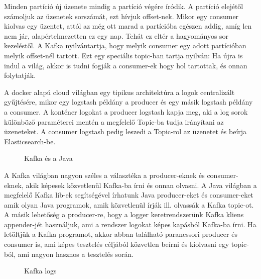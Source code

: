 Minden partíció új üzenete mindig a partíció végére íródik. A partíció elejétől számoljuk az üzenetek sorszámát, ezt hívjuk offset-nek. Mikor egy consumer kiolvas egy üzentet, attól az még ott marad a partícióba egészen addig, amíg len nem jár, alapértelmezetten ez egy nap. Tehát ez eltér a hagyományos sor kezeléstől. A Kafka nyilvántartja, hogy melyik consumer egy adott partícióban melyik offset-nél tartott. Ezt egy speciális topic-ban tartja nyilván: Ha újra is indul a világ, akkor is tudni fogják a consumer-ek hogy hol tartottak, és onnan folytatják.


A docker alapú cloud világban egy tipikus architektúra a logok centralizált gyűjtésére, mikor egy logstash példány a producer és egy másik logstash példány a consumer. A konténer logokat a producer logstash kapja meg, aki a log sorok különböző paraméterei mentén a megfelelő Topic-ba tudja irányítani az üzeneteket. A consumer logstash pedig leszedi a Topic-rol az üzenetet és beírja Elasticsearch-be. 

\begin{figure}[ht]
	\centering
	\caption{Kafka és a Java} 
	\label{fig:kafka-elastic}
\end{figure}

A Kafka világban nagyon széles a választéka a producer-eknek és consumer-eknek, akik képesek közvetlenül Kafka-ba írni és onnan olvasni. A Java világban a megfelelő Kafka lib-ek segítségével írhatunk Java producer-eket és consumer-eket amik olyan Java programok, amik közvetlenül írják ill. olvassák a Kafka topic-ot. A másik lehetőség a producer-re, hogy a logger keretrendszerünk Kafka kliens appender-jét használjuk, ami a rendszer logokat képes kapásból Kafka-ba írni. Ha letöltjük a Kafka programot, akkor abban található parancssori producer és consumer is, ami képes tesztelés céljából közvetlen beírni és kiolvasni egy topic-ból, ami nagyon hasznos a tesztelés során.

\begin{figure}[ht]
	\centering
	\caption{Kafka logs} 
	\label{fig:kafka-java}
\end{figure}

     